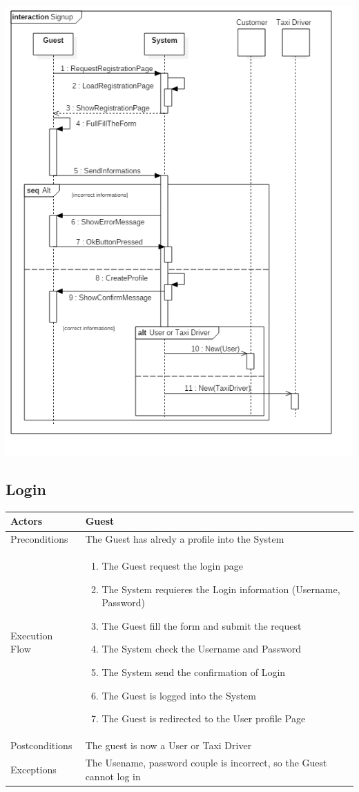 \documentclass[english]{article}
\begin{document}
\includegraphics[width=\textwidth]{Signup}

\subsection{Login}

\begin{tabular}{lp{8cm}}
\hline
Actors & Guest \\
\hline
Preconditions &   The Guest has alredy a profile into the System\\
\hline
Execution Flow &  
		\begin{enumerate}
			\item The Guest request the login page
			\item The System requieres the Login information (Username, Password)
			\item The Guest fill the form and submit the request
			\item The System check the Username and Password
			\item The System send the confirmation of Login
			\item The Guest is logged into the System
			\item The Guest is redirected to the User profile Page
		\end{enumerate} 
	\\ 
\hline
Postconditions & The guest is now a User or Taxi Driver \\
\hline
Exceptions & The Usename, password couple is incorrect, so the Guest cannot log in
\end{tabular}
\end{document}
